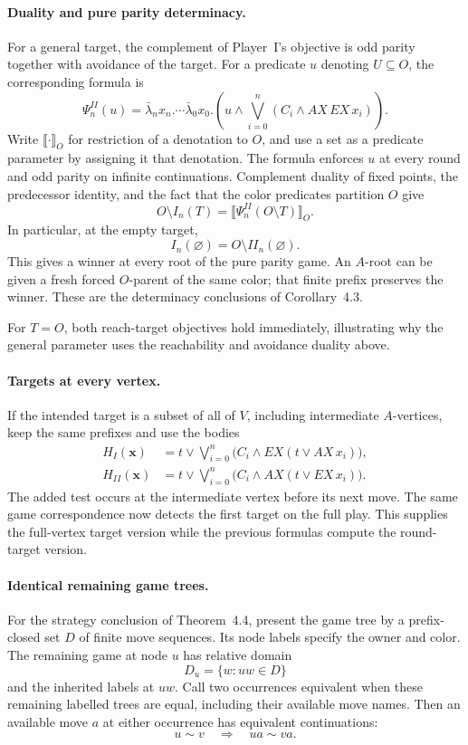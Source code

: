 \paragraph{Duality and pure parity determinacy.}
For a general target,
the complement of Player~I's
objective is odd parity
together with avoidance
of the target.
For a predicate \(u\) denoting
\(U\subseteq O\), the corresponding
formula is
\[
 \Psi_n^{II}(u)=
 \bar\lambda_nx_n.\cdots\bar\lambda_0x_0.
 \left(u\land
      \bigvee_{i=0}^n(C_i\land AX\,EX\,x_i)\right).
\]
Write \(\llbracket\cdot\rrbracket_O\)
for restriction of a denotation
to \(O\), and use a set
as a predicate parameter by
assigning it that denotation.
The formula enforces \(u\) at
every round and odd
parity on infinite
continuations. Complement
duality of fixed points,
the predecessor identity,
and the fact that
the color predicates
partition \(O\) give
\[
 O\setminus I_n(T)
     =\llbracket\Psi_n^{II}(O\setminus T)\rrbracket_O.
\]
In particular, at the
empty target,
\[
 I_n(\varnothing)=O\setminus II_n(\varnothing).
\]
This gives a winner
at every root of the
pure parity game.
An \(A\)-root can
be given a fresh
forced \(O\)-parent
of the same color;
that finite prefix
preserves the winner.
These are the determinacy
conclusions of Corollary~4.3.

For \(T=O\), both
reach-target objectives
hold immediately, illustrating
why the general parameter
uses the reachability and
avoidance duality above.

\paragraph{Targets at every vertex.}
If the intended target
is a subset of all
of \(V\), including
intermediate \(A\)-vertices,
keep the same prefixes
and use the bodies
\[
\begin{aligned}
 H_I(\mathbf x)
   &=t\lor\bigvee_{i=0}^n
         \bigl(C_i\land EX(t\lor AX\,x_i)\bigr),\\
 H_{II}(\mathbf x)
   &=t\lor\bigvee_{i=0}^n
         \bigl(C_i\land AX(t\lor EX\,x_i)\bigr).
\end{aligned}
\]
The added test occurs
at the intermediate vertex
before its next move.
The same game correspondence
now detects the first
target on the full play.
This supplies the full-vertex
target version while the
previous formulas compute
the round-target version.

\paragraph{Identical remaining game trees.}
\label{sec:p09-emerson-jutla-residual-strategies}
For the strategy conclusion
of Theorem~4.4, present
the game tree by a
prefix-closed set \(D\)
of finite move sequences.
Its node labels specify
the owner and color.
The remaining game at
node \(u\) has relative
domain
\[
 D_u=\{w:uw\in D\}
\]
and the inherited labels
at \(uw\).
Call two occurrences
equivalent when these
remaining labelled trees
are equal, including
their available move names.
Then an available move
\(a\) at either occurrence
has equivalent continuations:
\[
 u\sim v\quad\Longrightarrow\quad ua\sim va.
\]

